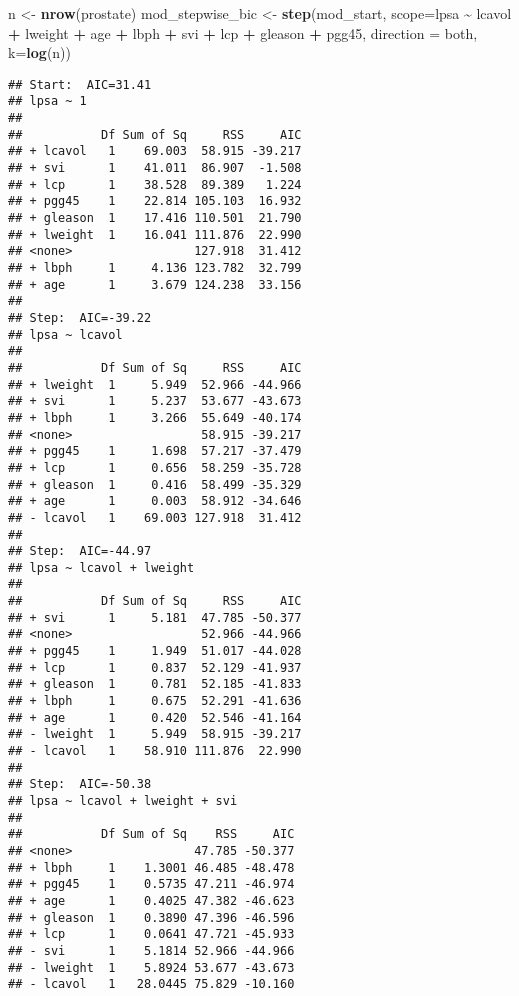 \documentclass[
]{article}
\newenvironment{Shaded}{\begin{snugshade}}{\end{snugshade}}
\newcommand{\AttributeTok}[1]{\textcolor[rgb]{0.13,0.29,0.53}{#1}}
\newcommand{\FunctionTok}[1]{\textcolor[rgb]{0.13,0.29,0.53}{\textbf{#1}}}
\newcommand{\NormalTok}[1]{#1}
\newcommand{\OtherTok}[1]{\textcolor[rgb]{0.56,0.35,0.01}{#1}}
\newcommand{\SpecialCharTok}[1]{\textcolor[rgb]{0.81,0.36,0.00}{\textbf{#1}}}
\newcommand{\StringTok}[1]{\textcolor[rgb]{0.31,0.60,0.02}{#1}}
\begin{document}
\begin{enumerate}
\begin{Shaded}
\begin{Highlighting}[]
\NormalTok{n }\OtherTok{\textless{}{-}} \FunctionTok{nrow}\NormalTok{(prostate)}
\NormalTok{mod\_stepwise\_bic }\OtherTok{\textless{}{-}} \FunctionTok{step}\NormalTok{(mod\_start, }\AttributeTok{scope=}\NormalTok{lpsa }\SpecialCharTok{\textasciitilde{}}\NormalTok{ lcavol }\SpecialCharTok{+}\NormalTok{ lweight }\SpecialCharTok{+}\NormalTok{ age }\SpecialCharTok{+}\NormalTok{ lbph }\SpecialCharTok{+}\NormalTok{ svi }\SpecialCharTok{+}\NormalTok{ lcp }\SpecialCharTok{+}\NormalTok{ gleason }\SpecialCharTok{+}\NormalTok{ pgg45, }\AttributeTok{direction =} \StringTok{\textquotesingle{}both\textquotesingle{}}\NormalTok{, }\AttributeTok{k=}\FunctionTok{log}\NormalTok{(n))}
\end{Highlighting}
\end{Shaded}

\begin{verbatim}
## Start:  AIC=31.41
## lpsa ~ 1
## 
##           Df Sum of Sq     RSS     AIC
## + lcavol   1    69.003  58.915 -39.217
## + svi      1    41.011  86.907  -1.508
## + lcp      1    38.528  89.389   1.224
## + pgg45    1    22.814 105.103  16.932
## + gleason  1    17.416 110.501  21.790
## + lweight  1    16.041 111.876  22.990
## <none>                 127.918  31.412
## + lbph     1     4.136 123.782  32.799
## + age      1     3.679 124.238  33.156
## 
## Step:  AIC=-39.22
## lpsa ~ lcavol
## 
##           Df Sum of Sq     RSS     AIC
## + lweight  1     5.949  52.966 -44.966
## + svi      1     5.237  53.677 -43.673
## + lbph     1     3.266  55.649 -40.174
## <none>                  58.915 -39.217
## + pgg45    1     1.698  57.217 -37.479
## + lcp      1     0.656  58.259 -35.728
## + gleason  1     0.416  58.499 -35.329
## + age      1     0.003  58.912 -34.646
## - lcavol   1    69.003 127.918  31.412
## 
## Step:  AIC=-44.97
## lpsa ~ lcavol + lweight
## 
##           Df Sum of Sq     RSS     AIC
## + svi      1     5.181  47.785 -50.377
## <none>                  52.966 -44.966
## + pgg45    1     1.949  51.017 -44.028
## + lcp      1     0.837  52.129 -41.937
## + gleason  1     0.781  52.185 -41.833
## + lbph     1     0.675  52.291 -41.636
## + age      1     0.420  52.546 -41.164
## - lweight  1     5.949  58.915 -39.217
## - lcavol   1    58.910 111.876  22.990
## 
## Step:  AIC=-50.38
## lpsa ~ lcavol + lweight + svi
## 
##           Df Sum of Sq    RSS     AIC
## <none>                 47.785 -50.377
## + lbph     1    1.3001 46.485 -48.478
## + pgg45    1    0.5735 47.211 -46.974
## + age      1    0.4025 47.382 -46.623
## + gleason  1    0.3890 47.396 -46.596
## + lcp      1    0.0641 47.721 -45.933
## - svi      1    5.1814 52.966 -44.966
## - lweight  1    5.8924 53.677 -43.673
## - lcavol   1   28.0445 75.829 -10.160
\end{verbatim}


\end{enumerate}
\end{document}
